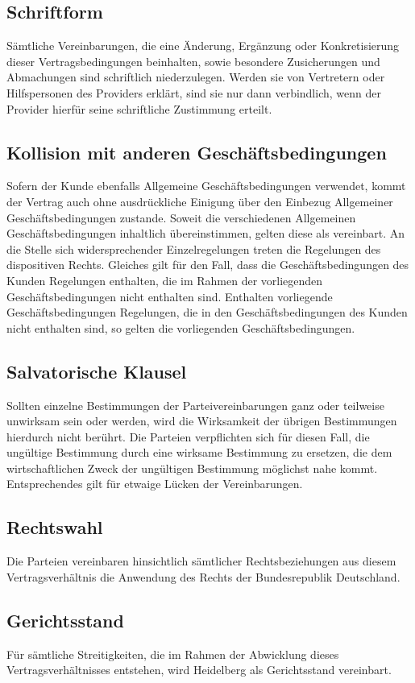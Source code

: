\documentclass{terms}
\begin{document}
\subsection{Schriftform}
Sämtliche Vereinbarungen, die eine Änderung, Ergänzung oder Konkretisierung dieser Vertragsbedingungen beinhalten, sowie besondere Zusicherungen und Abmachungen sind schriftlich niederzulegen. Werden sie von Vertretern oder Hilfspersonen des Providers erklärt, sind sie nur dann verbindlich, wenn der Provider hierfür seine schriftliche Zustimmung erteilt.

\subsection{Kollision mit anderen Geschäftsbedingungen}
Sofern der Kunde ebenfalls Allgemeine Geschäftsbedingungen verwendet, kommt der Vertrag auch ohne ausdrückliche Einigung über den Einbezug Allgemeiner Geschäftsbedingungen zustande. Soweit die verschiedenen Allgemeinen Geschäftsbedingungen inhaltlich übereinstimmen, gelten diese als vereinbart. An die Stelle sich widersprechender Einzelregelungen treten die Regelungen des dispositiven Rechts. Gleiches gilt für den Fall, dass die Geschäftsbedingungen des Kunden Regelungen enthalten, die im Rahmen der vorliegenden Geschäftsbedingungen nicht enthalten sind. Enthalten vorliegende Geschäftsbedingungen Regelungen, die in den Geschäftsbedingungen des Kunden nicht enthalten sind, so gelten die vorliegenden Geschäftsbedingungen.
\subsection{Salvatorische Klausel}
Sollten einzelne Bestimmungen der Parteivereinbarungen ganz oder teilweise unwirksam sein oder werden, wird die Wirksamkeit der übrigen Bestimmungen hierdurch nicht berührt. Die Parteien verpflichten sich für diesen Fall, die ungültige Bestimmung durch eine wirksame Bestimmung zu ersetzen, die dem wirtschaftlichen Zweck der ungültigen Bestimmung möglichst nahe kommt. Entsprechendes gilt für etwaige Lücken der Vereinbarungen.
\subsection{Rechtswahl}
Die Parteien vereinbaren hinsichtlich sämtlicher Rechtsbeziehungen aus diesem Vertragsverhältnis die Anwendung des Rechts der Bundesrepublik Deutschland.
\subsection{Gerichtsstand}
Für sämtliche Streitigkeiten, die im Rahmen der Abwicklung dieses Vertragsverhältnisses entstehen, wird Heidelberg als Gerichtsstand vereinbart.
\end{document}
